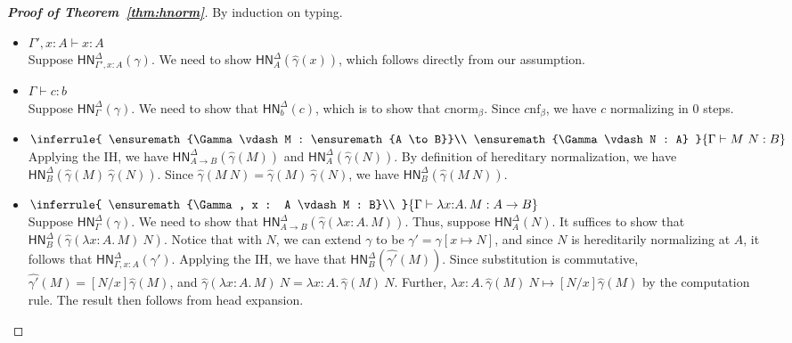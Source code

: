 \documentclass{article}
\newcommand{\hasEF}[3]{\ensuremath{#1 \vdash #2 : #3}}
\newcommand{\bnf}[1]{#1 \mathrel{\text{nf}_\beta}}
\newcommand{\bnorm}[1]{\ensuremath{#1 \mathrel{\text{norm}_\beta}}}
\newcommand{\hnorm}[3]{\ensuremath{\mathsf{HN}^{#1}_{#2}(#3)}}
\newcommand{\step}[2]{\ensuremath{#1 \mapsto #2}}
\newcommand{\fn}[2]{\ensuremath{#1 \to #2}}
\newcommand{\ap}[2]{\ensuremath{#1\ #2}}
\newcommand{\lam}[3]{\ensuremath{\lambda #1 {:} #2.\, #3}}
\begin{document}
\begin{proof}[\textbf{Proof of Theorem~\ref{thm:hnorm}}]
By induction on typing. 
\begin{itemize}
  \setlength\itemsep{1em}
  \item $\hasEF{\Gamma', x : A}{x}{A}$\\
    Suppose $\hnorm{\Delta}{\Gamma', x : A}{\gamma}$. 
    We need to  show $\hnorm{\Delta}{A}{\hat{\gamma}(x)}$, which follows directly from our assumption.
  \item $\hasEF{\Gamma}{c}{b}$\\
    Suppose $\hnorm{\Delta}{\Gamma}{\gamma}$. We need to show that $\hnorm{\Delta}{b}{c}$, which is to 
    show that $\bnorm{c}$. Since $\bnf{c}$, we have $c$ normalizing in 0 steps. 
  \item $\inferrule{
      \hasEF{\Gamma}{M}{\fn{A}{B}}\\
      \hasEF{\Gamma}{N}{A}
    }{\hasEF{\Gamma}{\ap{M}{N}}{B}}$\\
    Applying the IH, we have $\hnorm{\Delta}{\fn{A}{B}}{\hat{\gamma}(M)}$
    and $\hnorm{\Delta}{A}{\hat{\gamma}(N)}$. By definition of hereditary normalization, we have
    $\hnorm{\Delta}{B}{\ap{\hat{\gamma}(M)}{\hat{\gamma}(N)}}$. Since $\hat{\gamma}(\ap{M}{N}) = 
    \ap{\hat{\gamma}(M)}{\hat{\gamma}(N)}$, we have
    $\hnorm{\Delta}{B}{\hat{\gamma}(\ap{M}{N})}$.
  \item
    $\inferrule{
      \hasEF{\Gamma, x : A}{M}{B}\\
    }{\hasEF{\Gamma}{\lam{x}{A}{M}}{\fn{A}{B}}}$\\
    Suppose $\hnorm{\Delta}{\Gamma}{\gamma}$. We need to show that 
    $\hnorm{\Delta}{\fn{A}{B}}{\hat{\gamma}(\lam{x}{A}{M})}$. 
    Thus, suppose $\hnorm{\Delta}{A}{N}$. It suffices to show that 
    $\hnorm{\Delta}{B}{\ap{\hat{\gamma}(\lam{x}{A}{M})}{N}}$. Notice that with $N$, we can extend $\gamma$ to be
    $\gamma' = \gamma[x \mapsto N]$, and since $N$ is hereditarily normalizing at $A$, it follows that 
    $\hnorm{\Delta}{\Gamma,x : A}{\gamma'}$. Applying the IH, we have that $\hnorm{\Delta}{B}{\hat{\gamma'}(M)}$. 
    Since substitution is commutative, $\hat{\gamma'}(M) = [N/x]\hat{\gamma}(M)$, and 
    $\ap{\hat{\gamma}(\lam{x}{A}{M})}{N} = \ap{\lam{x}{A}{\hat{\gamma}(M)}}{N}$. Further, 
    $\step{\ap{\lam{x}{A}{\hat{\gamma}(M)}}{N}}{[N/x]\hat{\gamma}(M)}$ by the computation rule. The result then follows
    from head expansion. 
   \qedhere
\end{itemize}
\end{proof}
\end{document}
